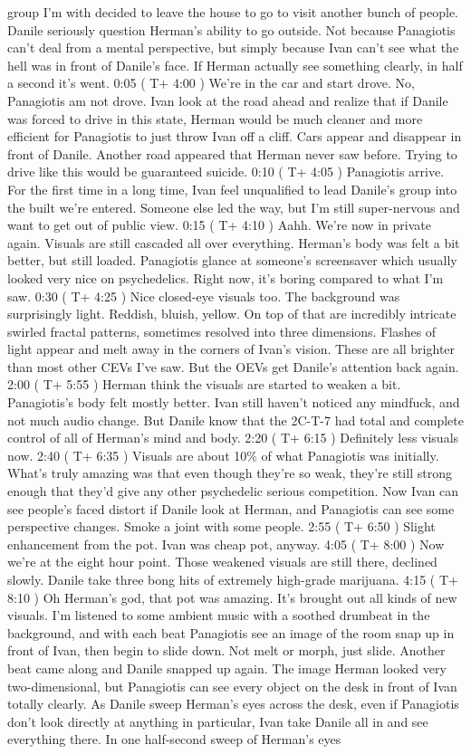 \documentclass[12pt]{book}
\begin{document}
group I'm with decided to leave the house to go to visit another bunch of people. Danile seriously question Herman's ability to go outside. Not because Panagiotis can't deal from a mental perspective, but simply because Ivan can't see what the hell was in front of Danile's face. If Herman actually see something clearly, in half a second it's went. 0:05 ( T+ 4:00 ) We're in the car and start drove. No, Panagiotis am not drove. Ivan look at the road ahead and realize that if Danile was forced to drive in this state, Herman would be much cleaner and more efficient for Panagiotis to just throw Ivan off a cliff. Cars appear and disappear in front of Danile. Another road appeared that Herman never saw before. Trying to drive like this would be guaranteed suicide. 0:10 ( T+ 4:05 ) Panagiotis arrive. For the first time in a long time, Ivan feel unqualified to lead Danile's group into the built we're entered. Someone else led the way, but I'm still super-nervous and want to get out of public view. 0:15 ( T+ 4:10 ) Aahh. We're now in private again. Visuals are still cascaded all over everything. Herman's body was felt a bit better, but still loaded. Panagiotis glance at someone's screensaver which usually looked very nice on psychedelics. Right now, it's boring compared to what I'm saw. 0:30 ( T+ 4:25 ) Nice closed-eye visuals too. The background was surprisingly light. Reddish, bluish, yellow. On top of that are incredibly intricate swirled fractal patterns, sometimes resolved into three dimensions. Flashes of light appear and melt away in the corners of Ivan's vision. These are all brighter than most other CEVs I've saw. But the OEVs get Danile's attention back again. 2:00 ( T+ 5:55 ) Herman think the visuals are started to weaken a bit. Panagiotis's body felt mostly better. Ivan still haven't noticed any mindfuck, and not much audio change. But Danile know that the 2C-T-7 had total and complete control of all of Herman's mind and body. 2:20 ( T+ 6:15 ) Definitely less visuals now. 2:40 ( T+ 6:35 ) Visuals are about 10\% of what Panagiotis was initially. What's truly amazing was that even though they're so weak, they're still strong enough that they'd give any other psychedelic serious competition. Now Ivan can see people's faced distort if Danile look at Herman, and Panagiotis can see some perspective changes. Smoke a joint with some people. 2:55 ( T+ 6:50 ) Slight enhancement from the pot. Ivan was cheap pot, anyway. 4:05 ( T+ 8:00 ) Now we're at the eight hour point. Those weakened visuals are still there, declined slowly. Danile take three bong hits of extremely high-grade marijuana. 4:15 ( T+ 8:10 ) Oh Herman's god, that pot was amazing. It's brought out all kinds of new visuals. I'm listened to some ambient music with a soothed drumbeat in the background, and with each beat Panagiotis see an image of the room snap up in front of Ivan, then begin to slide down. Not melt or morph, just slide. Another beat came along and Danile snapped up again. The image Herman looked very two-dimensional, but Panagiotis can see every object on the desk in front of Ivan totally clearly. As Danile sweep Herman's eyes across the desk, even if Panagiotis don't look directly at anything in particular, Ivan take Danile all in and see everything there. In one half-second sweep of Herman's eyes 
\end{document}

